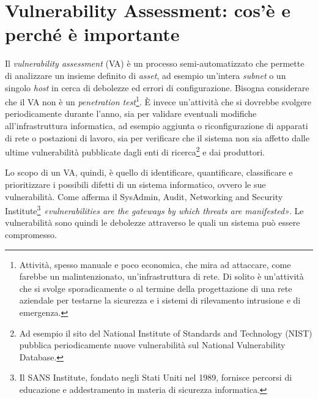 \documentclass[target=mst,aauheader=]{thud}
\begin{document}
\chapter{Vulnerability Assessment: cos’è e perché è importante}

Il \textit{vulnerability assessment} (VA) è un processo semi-automatizzato che permette di analizzare un insieme definito di \textit{asset}, ad esempio un’intera \textit{subnet} o un singolo \textit{host} in cerca di debolezze ed errori di configurazione. Bisogna considerare che il VA non è un \textit{penetration test}\footnote{Attività, spesso manuale e poco economica, che mira ad attaccare, come farebbe un malintenzionato, un’infrastruttura di rete. Di solito è un’attività che si svolge sporadicamente o al termine della progettazione di una rete aziendale per testarne la sicurezza e i sistemi di rilevamento intrusione e di emergenza.}. È invece un’attività che si dovrebbe svolgere periodicamente durante l’anno, sia per validare eventuali modifiche all’infrastruttura informatica, ad esempio aggiunta o riconfigurazione di apparati di rete o postazioni di lavoro, sia per verificare che il sistema non sia affetto dalle ultime vulnerabilità pubblicate dagli enti di ricerca\footnote{Ad esempio il sito del National Institute of Standards and Technology (NIST) pubblica periodicamente nuove vulnerabilità sul National Vulnerability Database.} e dai produttori.

Lo scopo di un VA, quindi, è quello di identificare, quantificare, classificare e prioritizzare i possibili difetti di un sistema informatico, ovvero le sue vulnerabilità. Come afferma il SysAdmin, Audit, Networking and Security Institute\footnote{Il SANS Institute, fondato negli Stati Uniti nel 1989, fornisce percorsi di educazione e addestramento in materia di sicurezza informatica.} \textit{«vulnerabilities are the gateways by which threats are manifested»}. Le vulnerabilità sono quindi le debolezze attraverso le quali un sistema può essere compromesso.
\end{document}
